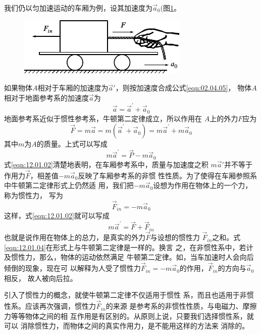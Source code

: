 我们仍以匀加速运动的车厢为例，设其加速度为$ \vec{a} _ { 0 } $(图\ref{fig:12.01}。
\begin{figure}[h]
    \centering
    \includegraphics{figure/fig12.01}
    \caption{}
    \label{fig:12.01}
\end{figure}
如果物体$ A $相对于车厢的加速度为$ \vec{a}' $，则按加速度合成公式\eqref{eqn:02.04.05}，
物体$ A $相对于地面参考系的加速度$ \vec{a} $为
\begin{equation}\label{eqn:12.01.01}
    \vec{a} = \vec{a} ^ { \prime } + \vec{a} _ { 0 }
\end{equation}
地面参考系近似于惯性参考系，牛顿第二定律成立，所以作用在
$ A $上的外力$ F $应为
\begin{equation*}
    \vec{F} = m \vec{a} = m \left( \vec{a} ^ { \prime } + \vec{a} _ { 0 } \right) = m \vec{a} ^ { \prime } + m \vec{a} _ { 0 }
\end{equation*}
其中$ m $为$ A $的质量。上式可以写成
\begin{equation}\label{eqn:12.01.02}
    m \vec{a} ^ { \prime } = \vec{P} - m \vec{a} _ { 0 }
\end{equation}
式\eqref{eqn:12.01.02}清楚地表明，在车厢参考系中，质量与加速度之积
$ m \vec{a} ' $并不等于作用力$\vec{F}$，相差值$ - m \vec{a} _ 0 $反映了车厢参考系的非惯
性性质。为了使得在车厢参照系中牛顿第二定律形式上仍然适
用，我们把$-m\vec{a}_0$设想为作用在物体上的一个力，称为惯性力，
写为
\begin{equation}\label{eqn:12.01.03}
    \vec{F} _ { in } = - m \vec{a} _ { 0 }
\end{equation}
这样，式\eqref{eqn:12.01.02}就可以写成
\begin{equation}\label{eqn:12.01.04}
    m \vec{a} ^ { \prime } = \vec{F} + \vec{F} _ {in}
\end{equation}
也就是说作用在物体上的总力，是真实的外力$\vec{F}$与设想的惯性力
$\vec{F}_{in}$之和。式\eqref{eqn:12.01.04}在形式上与牛顿第二定律是一样的。换言
之，在非惯性系中，若计及惯性力，那么，物体的运动依然满足
牛顿第二定律。如，当车加速时人会向后倾倒的现象，现在可
以解释为人受了惯性力$ \vec{F}_{in}=-m\vec{a}_0 $的作用，$\vec{F}_{in}$的方向与$\vec{a}_0$相反，
故人被向后拉。

引入了惯性力的概念，就使牛顿第二定律不仅适用于惯性
系，而且也适用于非惯性系。应该再次强调，惯性力$ \vec{F}_{in} $的来源
是参考系的非惯性性质，与电磁力、摩擦力等等物体之间的相
互作用是有区别的。从原则上说，只要我们选择惯性系，就可以
消除惯性力，而物体之间的真实作用力，是不能用这样的方法来
消除的。

